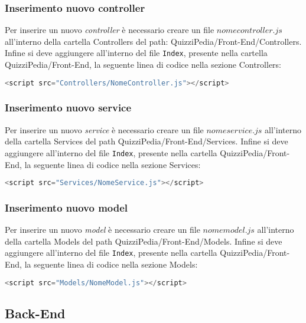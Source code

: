 \subsubsection{Inserimento nuovo controller}  
Per inserire un nuovo \textit{controller} è necessario creare un file $nomecontroller.js$ all'interno della cartella Controllers del path: QuizziPedia/Front-End/Controllers. Infine si deve aggiungere all'interno del file \texttt{Index}, presente nella cartella QuizziPedia/Front-End, la seguente linea di codice nella sezione Controllers:
\begin{lstlisting}[language=Java,firstnumber=1]
	<script src="Controllers/NomeController.js"></script>
\end{lstlisting}

\subsubsection{Inserimento nuovo service}
Per inserire un nuovo \textit{service} è necessario creare un file $nomeservice.js$ all'interno della cartella Services del path QuizziPedia/Front-End/Services. Infine si deve aggiungere all'interno del file \texttt{Index}, presente nella cartella QuizziPedia/Front-End, la seguente linea di codice nella sezione Services:
\begin{lstlisting}[language=Java,firstnumber=1]
<script src="Services/NomeService.js"></script>
\end{lstlisting}

\subsubsection{Inserimento nuovo model}
Per inserire un nuovo \textit{model} è necessario creare un file $nomemodel.js$ all'interno della cartella Models del path QuizziPedia/Front-End/Models. Infine si deve aggiungere all'interno del file \texttt{Index}, presente nella cartella QuizziPedia/Front-End, la seguente linea di codice nella sezione Models:
\begin{lstlisting}[language=Java,firstnumber=1]
<script src="Models/NomeModel.js"></script>
\end{lstlisting}


\subsection{Back-End}
